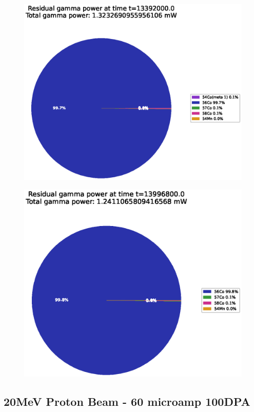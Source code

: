 \begin{figure}[!htb]
\centering
\includegraphics[width=0.7\linewidth]{chapters/results_activity_code/fe_100dpa/endofbeam/15MeV_0400_13392000.eps}
\caption{}
\label{fig:5mev-proton-100dpa}
\end{figure}

\begin{figure}[!htb]
\centering
\includegraphics[width=0.7\linewidth]{chapters/results_activity_code/fe_100dpa/endofbeam/15MeV_0500_13996800.eps}
\caption{}
\label{fig:5mev-proton-100dpa}
\end{figure}



\clearpage
\FloatBarrier
\subsection{20MeV Proton Beam - 60 microamp 100DPA}

